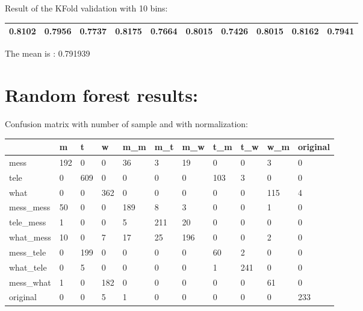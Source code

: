 Result of the KFold validation with 10 bins:
 {\def\arraystretch{1.3} 
 \begin{table}[H] 
\centering 
\begin{tabular}{|l |l |l |l |l |l |l |l |l |l |}  
\hline 
0.8102&
0.7956&
0.7737&
0.8175&
0.7664&
0.8015&
0.7426&
0.8015&
0.8162&
0.7941\\ \hline  

\end{tabular} 
\end{table} }

The mean is : 0.791939\section{Random forest results:} 
Confusion matrix with number of sample and with normalization:
 {\def\arraystretch{1.3} 
 \begin{table}[H] 
\centering 
\begin{tabular}{|l|l|l|l|l|l|l|l|l|l|l|} 
\hline 
  &m  &t  &w  &m\_m  &m\_t  &m\_w  &t\_m  &t\_w  &w\_m  &original  \\ \hline
mess  &192  &0  &0  &36  &3  &19  &0  &0  &3  &0  \\ \hline
tele  &0  &609  &0  &0  &0  &0  &103  &3  &0  &0  \\ \hline
what  &0  &0  &362  &0  &0  &0  &0  &0  &115  &4  \\ \hline
mess\_mess  &50  &0  &0  &189  &8  &3  &0  &0  &1  &0  \\ \hline
tele\_mess  &1  &0  &0  &5  &211  &20  &0  &0  &0  &0  \\ \hline
what\_mess  &10  &0  &7  &17  &25  &196  &0  &0  &2  &0  \\ \hline
mess\_tele  &0  &199  &0  &0  &0  &0  &60  &2  &0  &0  \\ \hline
what\_tele  &0  &5  &0  &0  &0  &0  &1  &241  &0  &0  \\ \hline
mess\_what  &1  &0  &182  &0  &0  &0  &0  &0  &61  &0  \\ \hline
original  &0  &0  &5  &1  &0  &0  &0  &0  &0  &233  \\ \hline
\end{tabular} 
\end{table} }

